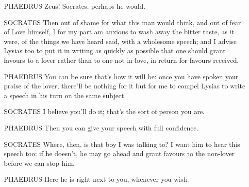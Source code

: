 PHAEDRUS Zeus! Socrates, perhaps he would.

SOCRATES Then out of shame for what this man would think, and out of
fear of Love himself, I for my part am anxious to wash away the bitter
taste, as it were, of the things we have heard said, with a wholesome
speech; and I advise Lysias too  to put it in writing as quickly
as possible that one should grant favours to a lover rather than to one
not in love, in return for favours
received.

PHAEDRUS You can be sure that's how it will be: once you have spoken
your praise of the lover, there'll be nothing for it but for me to
compel Lysias to write a speech in his turn on the  same subject

SOCRATES I believe you'll do it; that's the sort of person you are.

PHAEDRUS Then you can give your speech with full confidence.

SOCRATES Where, then, is that boy I was talking to? I want him to hear
this speech too; if he doesn't, he may go ahead and  grant
favours to the non-lover before we can stop him.

PHAEDRUS Here he is right next to you, whenever you
wish.

